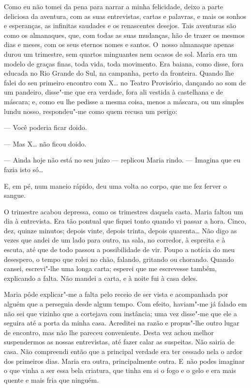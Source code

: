 \begin{linenumbers}
Como eu não tomei da pena para narrar a minha felicidade, deixo a parte
deliciosa da aventura, com as suas entrevistas, cartas e palavras, e
mais os sonhos e esperanças, as infinitas saudades e os renascentes
desejos. Tais aventuras são como os almanaques, que, com todas as suas
mudanças, hão de trazer os mesmos dias e meses, com os seus eternos
nomes e santos. O~nosso almanaque apenas durou um trimestre, sem quartos
minguantes nem ocasos de sol. Maria era um modelo de graças finas, toda
vida, toda movimento. Era baiana, como disse, fora educada no Rio Grande
do Sul, na campanha, perto da fronteira. Quando lhe falei do seu
primeiro encontro com X\ldots{} no Teatro Provisório, dançando ao som de um
pandeiro, disse"-me que era verdade, fora ali vestida à castelhana e de
máscara; e, como eu lhe pedisse a mesma coisa, menos a máscara, ou um
simples lundu nosso, respondeu"-me como quem recusa um perigo:

--- Você poderia ficar doido.

--- Mas X\ldots{} não ficou doido.

--- Ainda hoje não está no seu juízo --- replicou Maria rindo. --- Imagina
que eu fazia isto só\ldots{}

E, em pé, num maneio rápido, deu uma volta ao corpo, que me fez ferver o
sangue.

O trimestre acabou depressa, como os trimestres daquela casta. Maria
faltou um dia à entrevista. Era tão pontual que fiquei tonto quando vi
passar a hora. Cinco, dez, quinze minutos; depois vinte, depois trinta,
depois quarenta\ldots{} Não digo as vezes que andei de um lado para outro, na
sala, no corredor, à espreita e à escuta, até que de todo passou a
possibilidade de vir. Poupo a notícia do meu desespero, o tempo que
rolei no chão, falando, gritando ou chorando. Quando cansei, escrevi"-lhe
uma longa carta; esperei que me escrevesse também, explicando a falta.
Não mandei a carta, e à noite fui à casa deles.

Maria pôde explicar"-me a falta pelo receio de ser vista e acompanhada
por alguém que a perseguia desde algum tempo. Com efeito, haviam"-me já
falado em não sei que vizinho que a cortejava com instância; uma vez
disse"-me que ele a seguira até a porta da minha casa. Acreditei na razão
e propus"-lhe outro lugar de encontro, mas não lhe pareceu conveniente.
Desta vez achou melhor suspendermos as nossas entrevistas, até fazer
calar as suspeitas. Não sairia de casa. Não compreendi então que a
principal verdade era ter cessado nela o ardor dos primeiros dias. Maria
era outra, principalmente outra. E~não podes imaginar o que vinha a ser
essa bela criatura, que tinha em si o fogo e o gelo e era mais quente e
mais fria que ninguém.


\end{linenumbers}
